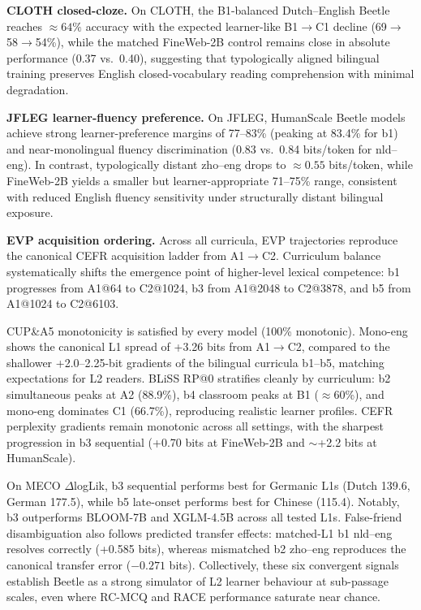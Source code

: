 \documentclass[11pt]{article}
\begin{document}
\textbf{CLOTH closed-cloze.} On CLOTH, the B1-balanced Dutch--English Beetle reaches $\approx64\%$ accuracy with the expected learner-like B1$\rightarrow$C1 decline (69$\rightarrow$58$\rightarrow$54\%), while the matched FineWeb-2B control remains close in absolute performance (0.37 vs.\ 0.40), suggesting that typologically aligned bilingual training preserves English closed-vocabulary reading comprehension with minimal degradation.

\textbf{JFLEG learner-fluency preference.} On JFLEG, HumanScale Beetle models achieve strong learner-preference margins of 77--83\% (peaking at 83.4\% for b1) and near-monolingual fluency discrimination (0.83 vs.\ 0.84 bits/token for nld--eng). In contrast, typologically distant zho--eng drops to $\approx0.55$ bits/token, while FineWeb-2B yields a smaller but learner-appropriate 71--75\% range, consistent with reduced English fluency sensitivity under structurally distant bilingual exposure.

\textbf{EVP acquisition ordering.} Across all curricula, EVP trajectories reproduce the canonical CEFR acquisition ladder from A1$\rightarrow$C2. Curriculum balance systematically shifts the emergence point of higher-level lexical competence: b1 progresses from A1@64 to C2@1024, b3 from A1@2048 to C2@3878, and b5 from A1@1024 to C2@6103.

CUP\&A5 monotonicity is satisfied by every model (100\% monotonic). Mono-eng shows the canonical L1 spread of +3.26 bits from A1$\rightarrow$C2, compared to the shallower +2.0--2.25-bit gradients of the bilingual curricula b1--b5, matching expectations for L2 readers. BLiSS RP@0 stratifies cleanly by curriculum: b2 simultaneous peaks at A2 (88.9\%), b4 classroom peaks at B1 ($\approx60$\%), and mono-eng dominates C1 (66.7\%), reproducing realistic learner profiles. CEFR perplexity gradients remain monotonic across all settings, with the sharpest progression in b3 sequential (+0.70 bits at FineWeb-2B and $\sim$+2.2 bits at HumanScale).

On MECO $\Delta$logLik, b3 sequential performs best for Germanic L1s (Dutch 139.6, German 177.5), while b5 late-onset performs best for Chinese (115.4). Notably, b3 outperforms BLOOM-7B and XGLM-4.5B across all tested L1s. False-friend disambiguation also follows predicted transfer effects: matched-L1 b1 nld--eng resolves correctly (+0.585 bits), whereas mismatched b2 zho--eng reproduces the canonical transfer error ($-0.271$ bits). Collectively, these six convergent signals establish Beetle as a strong simulator of L2 learner behaviour at sub-passage scales, even where RC-MCQ and RACE performance saturate near chance.
\end{document}
